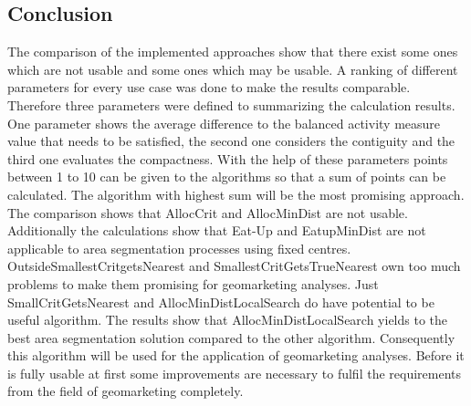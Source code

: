 \subsection{Conclusion}
The comparison of the implemented approaches show that there exist some ones which are not usable and some ones which may be usable. A ranking of different parameters for every use case was done to make the results comparable. Therefore three parameters were defined to summarizing the calculation results. One parameter shows the average difference to the balanced activity measure value that needs to be satisfied, the second one considers the contiguity and the third one evaluates the compactness. With the help of these parameters points between 1 to 10 can be given to the algorithms so that a sum of points can be calculated. The algorithm with highest sum will be the most promising approach. The comparison shows that AllocCrit and AllocMinDist are not usable. Additionally the calculations show that Eat-Up and EatupMinDist are not applicable to area segmentation processes using fixed centres. OutsideSmallestCritgetsNearest and SmallestCritGetsTrueNearest own too much problems to make them promising for geomarketing analyses. Just SmallCritGetsNearest and AllocMinDistLocalSearch do have potential to be useful algorithm. The results show that AllocMinDistLocalSearch yields to the best area segmentation solution compared to the other algorithm. Consequently this algorithm will be used for the application of geomarketing analyses. Before it is fully usable at first some improvements are necessary to fulfil the requirements from the field of geomarketing completely.

